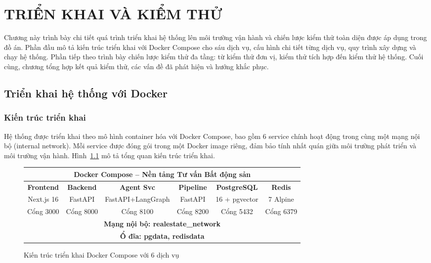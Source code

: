 \chapter{TRIỂN KHAI VÀ KIỂM THỬ}

Chương này trình bày chi tiết quá trình triển khai hệ thống lên môi trường vận hành và chiến lược kiểm thử toàn diện được áp dụng trong đồ án. Phần đầu mô tả kiến trúc triển khai với Docker Compose cho sáu dịch vụ, cấu hình chi tiết từng dịch vụ, quy trình xây dựng và chạy hệ thống. Phần tiếp theo trình bày chiến lược kiểm thử đa tầng: từ kiểm thử đơn vị, kiểm thử tích hợp đến kiểm thử hệ thống. Cuối cùng, chương tổng hợp kết quả kiểm thử, các vấn đề đã phát hiện và hướng khắc phục.

\section{Triển khai hệ thống với Docker}

\subsection{Kiến trúc triển khai}

Hệ thống được triển khai theo mô hình container hóa với Docker Compose, bao gồm 6 service chính hoạt động trong cùng một mạng nội bộ (internal network). Mỗi service được đóng gói trong một Docker image riêng, đảm bảo tính nhất quán giữa môi trường phát triển và môi trường vận hành. Hình~\ref{fig:docker-architecture} mô tả tổng quan kiến trúc triển khai.

\begin{figure}[H]
    \centering
    \begin{tabular}{|c|c|c|c|c|c|}
        \hline
        \multicolumn{6}{|c|}{\textbf{Docker Compose -- Nền tảng Tư vấn Bất động sản}} \\
        \hline
        \textbf{Frontend} & \textbf{Backend} & \textbf{Agent Svc} & \textbf{Pipeline} & \textbf{PostgreSQL} & \textbf{Redis} \\
        Next.js 16 & FastAPI & FastAPI+LangGraph & FastAPI & 16 + pgvector & 7 Alpine \\
        Cổng 3000 & Cổng 8000 & Cổng 8100 & Cổng 8200 & Cổng 5432 & Cổng 6379 \\
        \hline
        \multicolumn{6}{|c|}{\textbf{Mạng nội bộ: realestate\_network}} \\
        \hline
        \multicolumn{6}{|c|}{\textbf{Ổ đĩa: pgdata, redisdata}} \\
        \hline
    \end{tabular}
    \caption{Kiến trúc triển khai Docker Compose với 6 dịch vụ}
    \label{fig:docker-architecture}
\end{figure}

